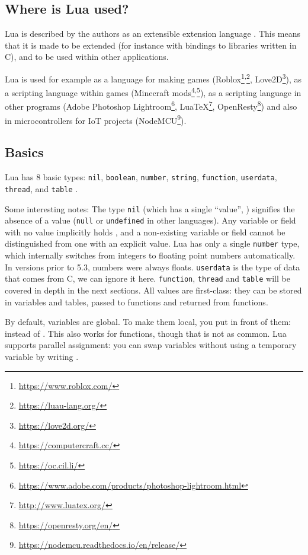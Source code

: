 \subsection{Where is Lua used?}
Lua is described by the authors as an extensible extension language \cite{ierusalimschy1996lua}. This means that it is made to be extended (for instance with bindings to libraries written in C), and to be used within other applications.

Lua is used for example as a language for making games (Roblox\footnote{\url{https://www.roblox.com/}}\textsuperscript{,}\footnote{\url{https://luau-lang.org/}}, Love2D\footnote{\url{https://love2d.org/}}), as a scripting language within games (Minecraft mods\footnote{\url{https://computercraft.cc/}}\textsuperscript{,}\footnote{\url{https://oc.cil.li/}}), as a scripting language in other programs (Adobe Photoshop Lightroom\footnote{\url{https://www.adobe.com/products/photoshop-lightroom.html}}, LuaTeX\footnote{\url{http://www.luatex.org/}}, OpenResty\footnote{\url{https://openresty.org/en/}}) and also in microcontrollers for IoT projects (NodeMCU\footnote{\url{https://nodemcu.readthedocs.io/en/release/}}).

\subsection{Basics}
Lua has 8 basic types: \texttt{nil}, \texttt{boolean}, \texttt{number}, \texttt{string}, \texttt{function}, \texttt{userdata}, \texttt{thread}, and \texttt{table} \cite[\S 2.1]{luareferencemanual}.

Some interesting notes:
The type \texttt{nil} (which has a single ``value'', ) signifies the absence of a value (\texttt{null} or \texttt{undefined} in other languages). Any variable or field with no value implicitly holds , and a non-existing variable or field cannot be distinguished from one with an explicit  value.
Lua has only a single \texttt{number} type, which internally switches from integers to floating point numbers automatically. In versions prior to 5.3, numbers were always floats. \texttt{userdata} is the type of data that comes from C, we can ignore it here.
\texttt{function}, \texttt{thread} and \texttt{table} will be covered in depth in the next sections. All values are first-class: they can be stored in variables and tables, passed to functions and returned from functions.

By default, variables are global. To make them local, you put  in front of them:  instead of . This also works for functions, though that is not as common. Lua supports parallel assignment: you can swap variables without using a temporary variable by writing .

